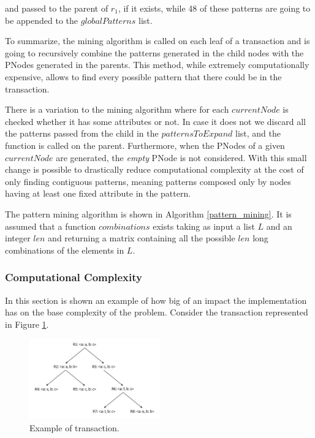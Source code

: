 \documentclass{acm_proc_article-sp-sigmod09}
\begin{document}
and passed to the parent of $r_1$, if it exists, while 48 of these patterns are going to be appended to the $globalPatterns$ list.

To summarize, the mining algorithm is called on each leaf of a transaction and is going to recursively combine the patterns generated in the child nodes with the PNodes generated in the parents. This method, while extremely computationally expensive, allows to find every possible pattern that there could be in the transaction.

There is a variation to the mining algorithm where for each $currentNode$ is checked whether it has some attributes or not. In case it does not we discard all the patterns passed from the child in the $patternsToExpand$ list, and the function is called on the parent. Furthermore, when the PNodes of a given $currentNode$ are generated, the \emph{empty} PNode is not considered. With this small change is possible to drastically reduce computational complexity at the cost of only finding contiguous patterns, meaning patterns composed only by nodes having at least one fixed attribute in the pattern.

The pattern mining algorithm is shown in Algorithm \ref{pattern_mining}. It is assumed that a function $combinations$ exists taking as input a list $L$ and an integer $len$ and returning a matrix containing all the possible $len$ long combinations of the elements in $L$.

\subsubsection{Computational Complexity}
In this section is shown an example of how big of an impact the implementation has on the base complexity of the problem. Consider the transaction represented in Figure \ref{fig:transactionFullComplexity}.

\begin{figure}[h!]
\centering
\includegraphics[width=0.5\textwidth]{FullTransactionExample.jpg}
\caption{Example of transaction.}
\label{fig:transactionFullComplexity}
\end{figure}
\end{document}

